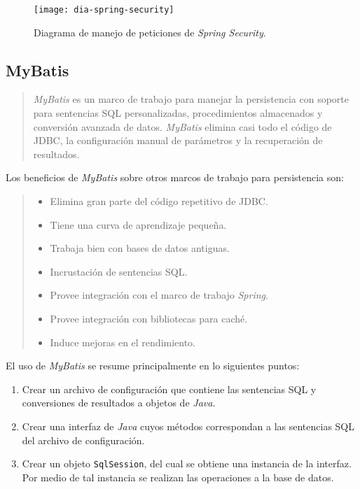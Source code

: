 \begin{figure}[h]
	\centering
	\texttt{[image: dia-spring-security]}
	\caption{Diagrama de manejo de peticiones de \textit{Spring Security}\cite{ProSpringSecurity}.}
	\label{fig:dia-spring-security}
\end{figure}

\subsection{MyBatis}\label{sec:mybatis}
\begin{quote}
\textit{MyBatis} es un marco de trabajo para manejar la persistencia con soporte para sentencias SQL personalizadas, procedimientos almacenados y conversión avanzada de datos. \textit{MyBatis} elimina casi todo el código de JDBC, la configuración manual de parámetros y la recuperación de resultados\cite{MyBatis}.
\end{quote}

Los beneficios de \textit{MyBatis} sobre otros marcos de trabajo para persistencia son\cite{PersistenceWithMyBatis}:
\begin{quote}
	\begin{itemize}
		\item Elimina gran parte del código repetitivo de JDBC.
		\item Tiene una curva de aprendizaje pequeña.
		\item Trabaja bien con bases de datos antiguas.
		\item Incrustación de sentencias SQL.
		\item Provee integración con el marco de trabajo \textit{Spring}.
		\item Provee integración con bibliotecas para caché.
		\item Induce mejoras en el rendimiento.
	\end{itemize}
\end{quote}

El uso de \textit{MyBatis} se resume principalmente en lo siguientes puntos\cite{PersistenceWithMyBatis}:
\begin{enumerate}
	\item Crear un archivo de configuración que contiene las sentencias SQL y conversiones de resultados a objetos de \textit{Java}.
	\item Crear una interfaz de \textit{Java} cuyos métodos correspondan a las sentencias SQL del archivo de configuración.
	\item Crear un objeto \texttt{SqlSession}, del cual se obtiene una instancia de la interfaz. Por medio de tal instancia se realizan las operaciones a la base de datos.
\end{enumerate}

